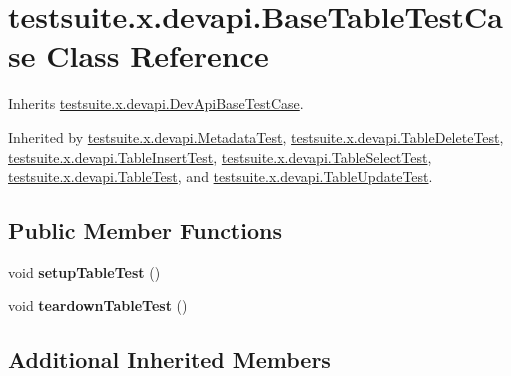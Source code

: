 \hypertarget{classtestsuite_1_1x_1_1devapi_1_1_base_table_test_case}{}\section{testsuite.\+x.\+devapi.\+Base\+Table\+Test\+Case Class Reference}
\label{classtestsuite_1_1x_1_1devapi_1_1_base_table_test_case}


Inherits \mbox{\hyperlink{classtestsuite_1_1x_1_1devapi_1_1_dev_api_base_test_case}{testsuite.\+x.\+devapi.\+Dev\+Api\+Base\+Test\+Case}}.



Inherited by \mbox{\hyperlink{classtestsuite_1_1x_1_1devapi_1_1_metadata_test}{testsuite.\+x.\+devapi.\+Metadata\+Test}}, \mbox{\hyperlink{classtestsuite_1_1x_1_1devapi_1_1_table_delete_test}{testsuite.\+x.\+devapi.\+Table\+Delete\+Test}}, \mbox{\hyperlink{classtestsuite_1_1x_1_1devapi_1_1_table_insert_test}{testsuite.\+x.\+devapi.\+Table\+Insert\+Test}}, \mbox{\hyperlink{classtestsuite_1_1x_1_1devapi_1_1_table_select_test}{testsuite.\+x.\+devapi.\+Table\+Select\+Test}}, \mbox{\hyperlink{classtestsuite_1_1x_1_1devapi_1_1_table_test}{testsuite.\+x.\+devapi.\+Table\+Test}}, and \mbox{\hyperlink{classtestsuite_1_1x_1_1devapi_1_1_table_update_test}{testsuite.\+x.\+devapi.\+Table\+Update\+Test}}.

\subsection*{Public Member Functions}
\begin{DoxyCompactItemize}
\item 
\mbox{\label{classtestsuite_1_1x_1_1devapi_1_1_base_table_test_case_ab75cadb98051a2ce2054cf8a1e870375}} 
void {\bfseries setup\+Table\+Test} ()
\item 
\mbox{\label{classtestsuite_1_1x_1_1devapi_1_1_base_table_test_case_acd54bd05e05774f819784bbc94c31535}} 
void {\bfseries teardown\+Table\+Test} ()
\end{DoxyCompactItemize}
\subsection*{Additional Inherited Members}


